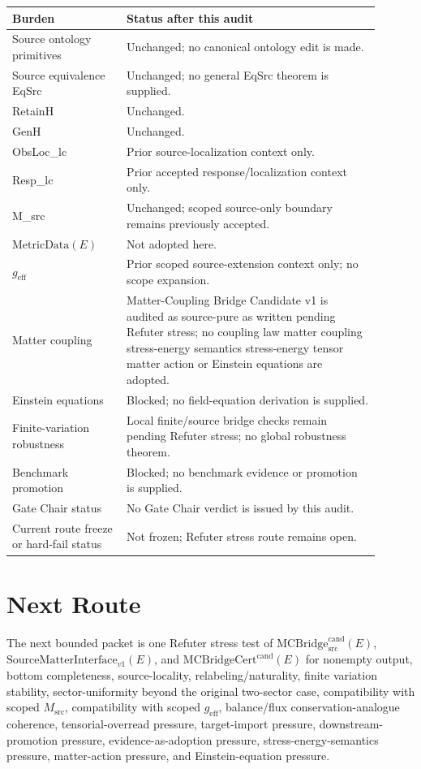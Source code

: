 \documentclass[11pt]{article}
\newcommand{\MetricData}{\mathrm{MetricData}}
\newcommand{\geff}{g_{\mathrm{eff}}}
\newcommand{\MCBridgeCand}{\mathrm{MCBridge}_{\mathrm{src}}^{\mathrm{cand}}}
\newcommand{\MCBridgeCertCand}{\mathrm{MCBridgeCert}^{\mathrm{cand}}}
\newcommand{\SMI}{\mathrm{SourceMatterInterface}_{v1}}
\begin{document}
\begin{longtable}{p{0.28\linewidth}p{0.62\linewidth}}
\toprule
Burden & Status after this audit \\
\midrule
Source ontology primitives & Unchanged; no canonical ontology edit is made. \\
Source equivalence EqSrc & Unchanged; no general EqSrc theorem is supplied. \\
RetainH & Unchanged. \\
GenH & Unchanged. \\
ObsLoc\_lc & Prior source-localization context only. \\
Resp\_lc & Prior accepted response/localization context only. \\
M\_src & Unchanged; scoped source-only boundary remains previously accepted. \\
\(\MetricData(E)\) & Not adopted here. \\
\(\geff\) & Prior scoped source-extension context only; no scope expansion. \\
Matter coupling & Matter-Coupling Bridge Candidate v1 is audited as source-pure as written pending Refuter stress; no coupling law matter coupling stress-energy semantics stress-energy tensor matter action or Einstein equations are adopted. \\
Einstein equations & Blocked; no field-equation derivation is supplied. \\
Finite-variation robustness & Local finite/source bridge checks remain pending Refuter stress; no global robustness theorem. \\
Benchmark promotion & Blocked; no benchmark evidence or promotion is supplied. \\
Gate Chair status & No Gate Chair verdict is issued by this audit. \\
Current route freeze or hard-fail status & Not frozen; Refuter stress route remains open. \\
\bottomrule
\end{longtable}

\section{Next Route}

The next bounded packet is one Refuter stress test of
\(\MCBridgeCand(E)\), \(\SMI(E)\), and \(\MCBridgeCertCand(E)\) for
nonempty output, bottom completeness, source-locality,
relabeling/naturality, finite variation stability, sector-uniformity beyond
the original two-sector case, compatibility with scoped \(M_{\mathrm{src}}\),
compatibility with scoped \(\geff\), balance/flux conservation-analogue
coherence, tensorial-overread pressure, target-import pressure,
downstream-promotion pressure, evidence-as-adoption pressure,
stress-energy-semantics pressure, matter-action pressure, and
Einstein-equation pressure.
\end{document}
